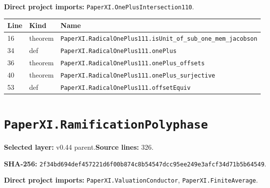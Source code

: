 \documentclass[10pt,oneside]{book}
\begin{document}

\textbf{Direct project imports:} \nolinkurl{PaperXI.OnePlusIntersection110}.

\begin{longtable}{@{}p{}p{}p{}@{}}\toprule Line&Kind&Name\\\midrule\endhead

16&theorem&\nolinkurl{PaperXI.RadicalOnePlus111.isUnit_of_sub_one_mem_jacobson}\\

34&def&\nolinkurl{PaperXI.RadicalOnePlus111.onePlus}\\

36&theorem&\nolinkurl{PaperXI.RadicalOnePlus111.onePlus_offsets}\\

40&theorem&\nolinkurl{PaperXI.RadicalOnePlus111.onePlus_surjective}\\

53&def&\nolinkurl{PaperXI.RadicalOnePlus111.offsetEquiv}\\

\bottomrule\end{longtable}

\section{\texorpdfstring{\nolinkurl{PaperXI.RamificationPolyphase}}{PaperXI.RamificationPolyphase}}\label{module:PaperXI.RamificationPolyphase}

\textbf{Selected layer:} v0.44 parent.\quad\textbf{Source lines:} 326.\par\textbf{SHA-256:} {\scriptsize\nolinkurl{2f34bd694def457221d6f00b874c8b54547dcc95ee249e3afcf34d71b5b64549}}.


\textbf{Direct project imports:} \nolinkurl{PaperXI.ValuationConductor}, \nolinkurl{PaperXI.FiniteAverage}.
\end{document}
